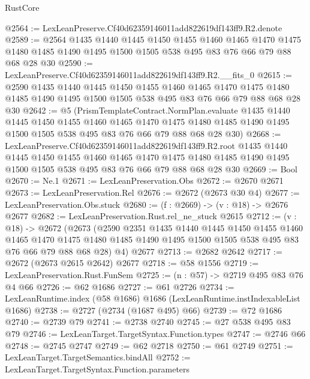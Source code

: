 \begin{lexlean}{RustCore}
\begin{coremodule}
@2564 := LexLeanPreserve.Cf40d62359146011add822619df143ff9.R2.denote
@2589 := @2564
    @1435
    @1440
    @1445
    @1450
    @1455
    @1460
    @1465
    @1470
    @1475
    @1480
    @1485
    @1490
    @1495
    @1500
    @1505
    @538
    @495
    @83
    @76
    @66
    @79
    @88
    @68
    @28
    @30
@2590 := LexLeanPreserve.Cf40d62359146011add822619df143ff9.R2.__fits_0
@2615 := @2590
    @1435
    @1440
    @1445
    @1450
    @1455
    @1460
    @1465
    @1470
    @1475
    @1480
    @1485
    @1490
    @1495
    @1500
    @1505
    @538
    @495
    @83
    @76
    @66
    @79
    @88
    @68
    @28
    @30
@2642 := @5
    (PrismTemplateContract.NormPlan.evaluate
      @1435
      @1440
      @1445
      @1450
      @1455
      @1460
      @1465
      @1470
      @1475
      @1480
      @1485
      @1490
      @1495
      @1500
      @1505
      @538
      @495
      @83
      @76
      @66
      @79
      @88
      @68
      @28
      @30)
@2668 := LexLeanPreserve.Cf40d62359146011add822619df143ff9.R2.root
    @1435
    @1440
    @1445
    @1450
    @1455
    @1460
    @1465
    @1470
    @1475
    @1480
    @1485
    @1490
    @1495
    @1500
    @1505
    @538
    @495
    @83
    @76
    @66
    @79
    @88
    @68
    @28
    @30
@2669 := Bool
@2670 := Ne.{1}
@2671 := LexLeanPreservation.Obs
@2672 := @2670 @2671
@2673 := LexLeanPreservation.Rel
@2676 := @2672 (@2673 @30 @4)
@2677 := LexLeanPreservation.Obs.stuck
@2680 := (f : @2669) -> (v : @18) -> @2676 @2677
@2682 := LexLeanPreservation.Rust.rel_ne_stuck @2615
@2712 := (v : @18) ->
  @2672
    (@2673
      (@2590
        @2351
        @1435
        @1440
        @1445
        @1450
        @1455
        @1460
        @1465
        @1470
        @1475
        @1480
        @1485
        @1490
        @1495
        @1500
        @1505
        @538
        @495
        @83
        @76
        @66
        @79
        @88
        @68
        @28)
      @4)
    @2677
@2713 := @2682 @2642
@2717 := @2672 (@2673 @2615 @2642) @2677
@2718 := @58 @1556
@2719 := LexLeanPreservation.Rust.FunSem
@2725 := (n : @57) -> @2719 @495 @83 @76 @4 @66
@2726 := @62 @1686
@2727 := @61 @2726
@2734 := LexLeanRuntime.index (@58 @1686) @1686 (LexLeanRuntime.instIndexableList @1686)
@2738 := @2727 (@2734 (@1687 @495) @66)
@2739 := @72 @1686
@2740 := @2739 @79
@2741 := @2738 @2740
@2745 := @27 @538 @495 @83 @79
@2746 := LexLeanTarget.TargetSyntax.Function.types
@2747 := @2746 @66
@2748 := @2745 @2747
@2749 := @62 @2718
@2750 := @61 @2749
@2751 := LexLeanTarget.TargetSemantics.bindAll
@2752 := LexLeanTarget.TargetSyntax.Function.parameters

\end{coremodule}
\end{lexlean}
